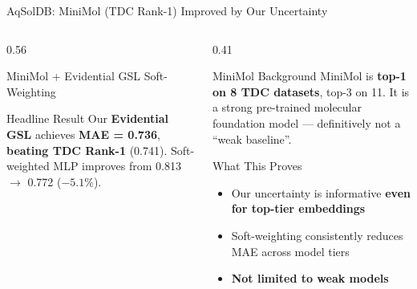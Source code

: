 \documentclass[aspectratio=169]{beamer}
\begin{document}
\begin{frame}[t,shrink=10]{AqSolDB: MiniMol (TDC Rank-1) Improved by Our Uncertainty}
\begin{columns}[T]
\begin{column}{0.56\textwidth}
\begin{block}{MiniMol + Evidential GSL Soft-Weighting}
\centering\footnotesize
\renewcommand{\arraystretch}{0.9}
\end{block}
\vspace{4pt}
\begin{alertblock}{Headline Result}
\footnotesize Our \textbf{Evidential GSL} achieves \textbf{MAE = 0.736}, \textbf{\alert{beating TDC Rank-1}} (0.741). Soft-weighted MLP improves from 0.813 $\to$ 0.772 ($-5.1\%$).
\end{alertblock}
\end{column}
\begin{column}{0.41\textwidth}
\begin{block}{MiniMol Background}
\footnotesize MiniMol is \textbf{top-1 on 8 TDC datasets}, top-3 on 11. It is a strong pre-trained molecular foundation model — definitively not a ``weak baseline''.
\end{block}
\vspace{4pt}
\begin{block}{What This Proves}
\footnotesize
\begin{itemize}
  \item Our uncertainty is informative \textbf{even for top-tier embeddings}
  \item Soft-weighting consistently reduces MAE across model tiers
  \item \textbf{Not limited to weak models}
\end{itemize}
\end{block}
\end{column}
\end{columns}
\end{frame}
\end{document}

